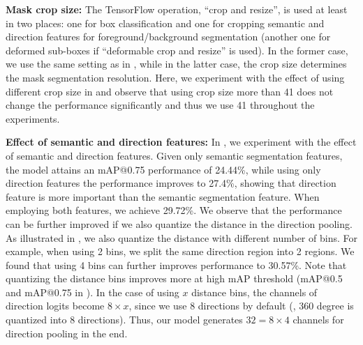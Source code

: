 \textbf{Mask crop size:} The TensorFlow operation, ``crop and resize'', is used at least in two places: one for box classification and one for cropping semantic and direction features for foreground/background segmentation (another one for deformed sub-boxes if ``deformable crop and resize'' is used). In the former case, we use the same setting as in \cite{huang2016speed, sun2017revisiting}, while in the latter case, the crop size determines the mask segmentation resolution. Here, we experiment with the effect of using different crop size in  and observe that using crop size more than 41 does not change the performance significantly and thus we use 41 throughout the experiments.

\begin{table}[!t]
  \centering
  \caption{Using crop size = 41 is sufficient for mask segmentation.}
  \label{tab:mask_crop_size}
\end{table}

\textbf{Effect of semantic and direction features:} In , we experiment with the effect of semantic and direction features. Given only semantic segmentation features, the model attains an mAP@0.75 performance of 24.44\%, while using only direction features the performance improves to 27.4\%, showing that direction feature is more important than the semantic segmentation feature. When employing both features, we achieve 29.72\%. We observe that the performance can be further improved if we also quantize the distance in the direction pooling. As illustrated in , we also quantize the distance with different number of bins. For example, when using 2 bins, we split the same direction region into 2 regions. We found that using 4 bins can further improves performance to 30.57\%. Note that quantizing the distance bins improves more at high mAP threshold (\cf mAP@0.5 and mAP@0.75 in ). In the case of using $x$ distance bins, the channels of direction logits become $8\times x$, since we use 8 directions by default (\ie, 360 degree is quantized into 8 directions). Thus, our model generates $32=8 \times 4$ channels for direction pooling in the end.

